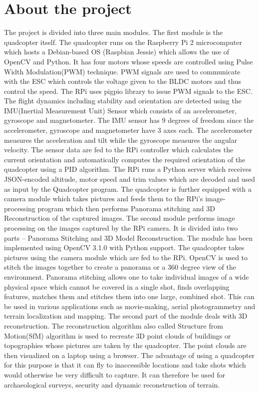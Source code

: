 \section{About the project} %
The project is divided into three main modules.  \linebreak
The first module is the quadcopter itself.
The quadcopter runs on the Raspberry Pi 2 microcomputer which hosts a Debian-based OS (Raspbian Jessie) which allows the use of OpenCV and Python. 
It has four motors whose speeds are controlled using Pulse Width Modulation(PWM) technique. PWM signals are used to communicate with the ESC which controls the voltage given to the BLDC motors and thus control the speed. The RPi uses pigpio library to issue PWM signals to the ESC. The flight dynamics including stability and orientation are detected using the IMU(Inertial Measurement Unit) Sensor which consists of an accelerometer, gyroscope and magnetometer. The IMU sensor has 9 degrees of freedom since the accelerometer, gyroscope and magnetometer have 3 axes each. The accelerometer measures the acceleration and tilt while the gyroscope measures the angular velocity. The sensor data are fed to the RPi controller which calculates the current orientation and automatically computes the required orientation of the quadcopter using a PID algorithm. The RPi runs a Python server which receives JSON-encoded altitude, motor speed and trim values which are decoded and used as input by the Quadcopter program. The quadcopter is further equipped with a camera module which takes pictures and feeds them to the RPi's image-processing program which then performs Panorama stitching and 3D Reconstruction of the captured images.
\linebreak
The second module performs image processing on the images captured by the RPi camera. It is divided into two parts – Panorama Stitching and 3D Model Reconstruction. The module has been implemented using OpenCV 3.1.0 with Python support. The quadcopter takes pictures using the camera module which are fed to the RPi. OpenCV is used to stitch the images together to create a panorama or a 360 degree view of the environment. Panorama stitching allows one to take individual images of a wide physical space which cannot be covered in a single shot, finds overlapping features, matches them and stitches them into one large, combined shot. This can be used in various applications such as movie-making, aerial photogrammetry and terrain localization and mapping. The second part of the module deals with 3D reconstruction. The reconstruction algorithm also called Structure from Motion(SfM) algorithm is used to recreate 3D point clouds of buildings or topographies whose pictures are taken by the quadcopter. The point clouds are then visualized on a laptop using a browser. The advantage of using a quadcopter for this purpose is that it can fly to inaccessible locations and take shots which would otherwise be very difficult to capture. It can therefore be used for archaeological surveys, security and dynamic reconstruction of terrain.
